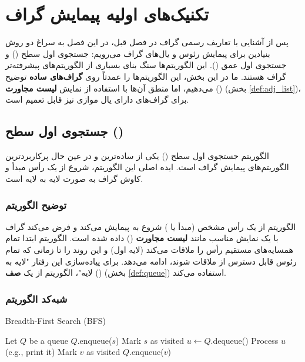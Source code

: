 \chapter{تکنیک‌های اولیه پیمایش گراف}
\label{chap:traversal}

پس از آشنایی با تعاریف رسمی گراف در فصل قبل، در این فصل به سراغ دو روش بنیادین برای پیمایش رئوس و یال‌های گراف می‌رویم: جستجوی اول سطح () و جستجوی اول عمق (). این الگوریتم‌ها سنگ بنای بسیاری از الگوریتم‌های پیشرفته‌تر گراف هستند. ما در این بخش، این الگوریتم‌ها را عمدتاً روی \textbf{گراف‌های ساده} توضیح می‌دهیم، اما منطق آن‌ها با استفاده از نمایش \textbf{لیست مجاورت} () (بخش \ref{def:adj_list})، برای گراف‌های دارای یال موازی نیز قابل تعمیم است.

\section{جستجوی اول سطح ()}
\label{sec:bfs}

الگوریتم جستجوی اول سطح () یکی از ساده‌ترین و در عین حال پرکاربردترین الگوریتم‌های پیمایش گراف است. ایده اصلی این الگوریتم، شروع از یک رأس مبدأ و کاوش گراف به صورت لایه به لایه است.

\subsection{توضیح الگوریتم}
الگوریتم  از یک رأس مشخص (مبدأ یا ) شروع به پیمایش می‌کند و فرض می‌کند گراف با یک نمایش مناسب مانند \textbf{لیست مجاورت} () داده شده است. الگوریتم ابتدا تمام همسایه‌های مستقیم رأس  را ملاقات می‌کند (لایه اول) و این روند را تا زمانی که تمام رئوس قابل دسترس از  ملاقات شوند، ادامه می‌دهد. برای پیاده‌سازی این رفتار "لایه به لایه"، الگوریتم از یک \textbf{صف} () (بخش \ref{def:queue}) استفاده می‌کند.

\subsection{شبه‌کد الگوریتم}
\begin{algorithm}[H]
	\caption{Breadth-First Search (BFS)}
	\label{alg:bfs}
	\begin{pseudocode}
		\State Let $Q$ be a queue
		\State $Q$.enqueue($s$)
		\State Mark $s$ as visited
		\State $u \gets Q$.dequeue()
		\State Process $u$ (e.g., print it)
		\State Mark $v$ as visited
		\State $Q$.enqueue($v$)
		\EndIf
		\EndFor
		\EndWhile
		\EndProcedure
	\end{pseudocode}
\end{algorithm}

